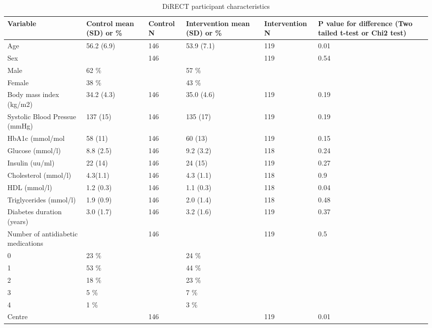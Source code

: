 \documentclass[11pt,twoside]{bristolthesis}
\begin{document}
\begin{landscape}
\begin{table}
\caption{\label{tab:DiRECT-participants}DiRECT participant characteristics}
\centering
\begin{tabu} to 
\toprule
Variable & Control mean (SD) or \% & Control N & Intervention mean (SD) or \% & Intervention N & P value for difference (Two tailed t-test or Chi2 test)\\
\midrule
Age & 56.2 (6.9) & 146 & 53.9 (7.1) & 119 & 0.01\\
Sex &  & 146 &  & 119 & 0.54\\
\hspace{1em}Male & 62 \% &  & 57 \% &  & \\
\hspace{1em}Female & 38 \% &  & 43 \% &  & \\
Body mass index (kg/m2) & 34.2 (4.3) & 146 & 35.0 (4.6) & 119 & 0.19\\
\addlinespace
Systolic Blood Pressue (mmHg) & 137 (15) & 146 & 135 (17) & 119 & 0.19\\
HbA1c (mmol/mol & 58 (11) & 146 & 60 (13) & 119 & 0.15\\
Glucose (mmol/l) & 8.8 (2.5) & 146 & 9.2 (3.2) & 118 & 0.24\\
Insulin (uu/ml) & 22 (14) & 146 & 24 (15) & 119 & 0.27\\
Cholesterol (mmol/l) & 4.3(1.1) & 146 & 4.3 (1.1) & 118 & 0.9\\
\addlinespace
HDL (mmol/l) & 1.2 (0.3) & 146 & 1.1 (0.3) & 118 & 0.04\\
Triglycerides (mmol/l) & 1.9 (0.9) & 146 & 2.0 (1.4) & 118 & 0.48\\
Diabetes duration (years) & 3.0 (1.7) & 146 & 3.2 (1.6) & 119 & 0.37\\
Number of antidiabetic medications &  & 146 &  & 119 & 0.5\\
\hspace{1em}0 & 23 \% &  & 24 \% &  & \\
\addlinespace
\hspace{1em}1 & 53 \% &  & 44 \% &  & \\
\hspace{1em}2 & 18 \% &  & 23 \% &  & \\
\hspace{1em}3 & 5 \% &  & 7 \% &  & \\
\hspace{1em}4 & 1 \% &  & 3 \% &  & \\
Centre &  & 146 &  & 119 & 0.01\\

\end{tabu}
\end{table}
\end{landscape}
\end{document}
